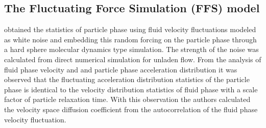 \documentclass[notitlepage]{revtex4-1}
\begin{document}
\subsection{The Fluctuating Force Simulation (FFS) model}
\label{sec:FFS}
\citet{goswami2010particle} obtained the statistics of particle phase using fluid velocity fluctuations modeled as white noise and embedding this random forcing on the particle phase through a hard sphere molecular dynamics type simulation. The strength of the noise was calculated from  direct numerical simulation for unladen flow. From the analysis of fluid phase velocity and and particle phase acceleration distribution it was observed  that the fluctuating acceleration distribution statistics of the particle phase is identical to the velocity distribution statistics of fluid phase with a scale factor of particle relaxation time. With this observation the authors calculated the velocity space diffusion coefficient from the autocorrelation of the fluid phase velocity fluctuation. 
\end{document}
